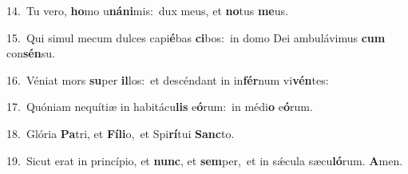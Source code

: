{\numbfont\textcolor{\numbcolor}{14.}}~Tu vero, \textbf{ho}\-mo u\-\textbf{ná}\-\textbf{ni}mis:~\star dux meus, et \textbf{no}\-tus \textbf{me}\-us.\par
{\numbfont\textcolor{\numbcolor}{15.}}~Qui simul mecum dulces capi\-\textbf{é}\-bas \textbf{ci}\-bos:~\star in domo Dei ambulávimus \textbf{cum} con\-\textbf{sén}\-su.\par
{\numbfont\textcolor{\numbcolor}{16.}}~Véniat mors \textbf{su}\-per \textbf{il}\-los:~\star et descéndant in in\-\textbf{fér}\-num vi\-\textbf{vén}\-tes:\par
{\numbfont\textcolor{\numbcolor}{17.}}~Quóniam nequítiæ in habitácu\textbf{lis} e\-\textbf{ó}\-rum:~\star in médi\textbf{o} e\-\textbf{ó}\-rum.\par
{\numbfont\textcolor{\numbcolor}{18.}}~Glória \textbf{Pa}\-tri, et \textbf{Fí}\-\textbf{li}o,~\star et Spi\-\textbf{rí}\-tui \textbf{Sanc}\-to.\par
{\numbfont\textcolor{\numbcolor}{19.}}~Sicut erat in princípio, et \textbf{nunc}\-, et \textbf{sem}\-per,~\star et in sǽcula sæcu\-\textbf{ló}\-rum. \textbf{A}\-men.\par
